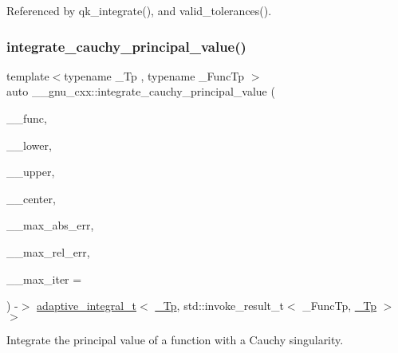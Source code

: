 Referenced by qk\+\_\+integrate(), and valid\+\_\+tolerances().

\mbox{\label{namespace____gnu__cxx_a609c33bc2044563a11ebb05ddcd7b4bb}} 
\subsubsection{\texorpdfstring{integrate\+\_\+cauchy\+\_\+principal\+\_\+value()}{integrate\_cauchy\_principal\_value()}}
{\footnotesize\ttfamily template$<$typename \+\_\+\+Tp , typename \+\_\+\+Func\+Tp $>$ \\
auto \+\_\+\+\_\+gnu\+\_\+cxx\+::integrate\+\_\+cauchy\+\_\+principal\+\_\+value (\begin{DoxyParamCaption}\item[{\+\_\+\+Func\+Tp}]{\+\_\+\+\_\+func,  }\item[{\hyperlink{namespace____gnu__cxx_a3b19a9c800ca194374ef9172290f7d79}{\+\_\+\+Tp}}]{\+\_\+\+\_\+lower,  }\item[{\hyperlink{namespace____gnu__cxx_a3b19a9c800ca194374ef9172290f7d79}{\+\_\+\+Tp}}]{\+\_\+\+\_\+upper,  }\item[{\hyperlink{namespace____gnu__cxx_a3b19a9c800ca194374ef9172290f7d79}{\+\_\+\+Tp}}]{\+\_\+\+\_\+center,  }\item[{\hyperlink{namespace____gnu__cxx_a3b19a9c800ca194374ef9172290f7d79}{\+\_\+\+Tp}}]{\+\_\+\+\_\+max\+\_\+abs\+\_\+err,  }\item[{\hyperlink{namespace____gnu__cxx_a3b19a9c800ca194374ef9172290f7d79}{\+\_\+\+Tp}}]{\+\_\+\+\_\+max\+\_\+rel\+\_\+err,  }\item[{std\+::size\+\_\+t}]{\+\_\+\+\_\+max\+\_\+iter = {} }\end{DoxyParamCaption}) -\/$>$  \hyperlink{struct____gnu__cxx_1_1adaptive__integral__t}{adaptive\+\_\+integral\+\_\+t}$<$ \hyperlink{namespace____gnu__cxx_a3b19a9c800ca194374ef9172290f7d79}{\+\_\+\+Tp}, std\+::invoke\+\_\+result\+\_\+t$<$ \+\_\+\+Func\+Tp, \hyperlink{namespace____gnu__cxx_a3b19a9c800ca194374ef9172290f7d79}{\+\_\+\+Tp} $>$$>$}

Integrate the principal value of a function with a Cauchy singularity. 

